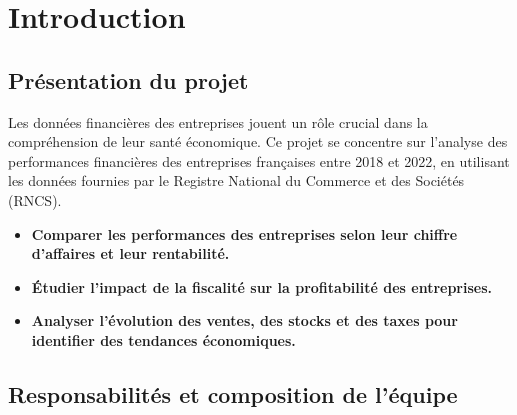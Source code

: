 \documentclass[mstat,12pt]{unswthesis}
\begin{document}


\afterpreface





%
%






\chapter{Introduction}\label{introduction}

\section{Présentation du projet}\label{pruxe9sentation-du-projet}

Les données financières des entreprises jouent un rôle crucial dans la
compréhension de leur santé économique. Ce projet se concentre sur
l'analyse des performances financières des entreprises françaises entre
2018 et 2022, en utilisant les données fournies par le Registre National
du Commerce et des Sociétés (RNCS).

\bigskip

\begin{itemize}[label=$\circ$]
    \item \textbf{Comparer les performances des entreprises selon leur chiffre d'affaires et leur rentabilité.}
    \item \textbf{Étudier l’impact de la fiscalité sur la profitabilité des entreprises.}
    \item \textbf{Analyser l’évolution des ventes, des stocks et des taxes pour identifier des tendances économiques.}
\end{itemize}

\medskip

\section{Responsabilités et composition de
l'équipe}\label{responsabilituxe9s-et-composition-de-luxe9quipe}

\medskip
\end{document}
